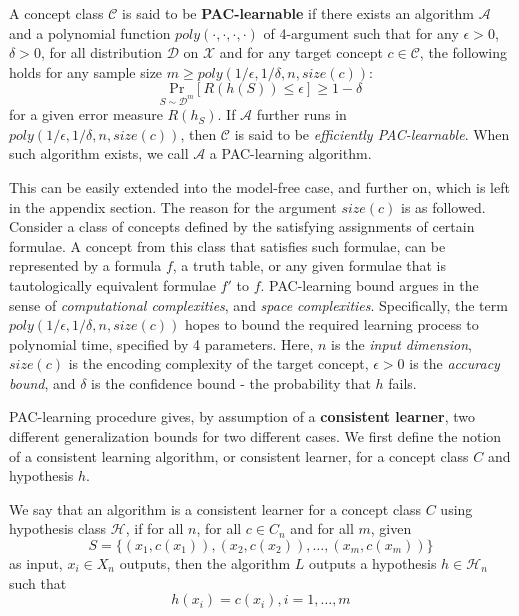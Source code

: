 \documentclass[twoside,10pt]{article}
\begin{document}
\begin{definition}
    A concept class $\mathcal{C}$ is said to be \textbf{PAC-learnable} if there exists an algorithm $\mathcal{A}$ and a polynomial function $poly(\cdot,\cdot,\cdot,\cdot)$ of 4-argument such that for any $\epsilon>0$, $\delta>0$, for all distribution $\mathcal{D}$ on $\mathcal{X}$ and for any target concept $c\in\mathcal{C}$, the following holds for any sample size $m\geq poly(1/\epsilon,1/\delta,n,size(c))$: $$\underset{S\sim \mathcal{D}^{m}}{\mathrm{Pr}}\left[ R(h(S))\leq \epsilon \right]\geq 1-\delta$$
    for a given error measure $R(h_{S})$. If $\mathcal{A}$ further runs in $poly(1/\epsilon,1/\delta,n,size(c))$, then $\mathcal{C}$ is said to be \textit{efficiently PAC-learnable}. When such algorithm exists, we call $\mathcal{A}$ a PAC-learning algorithm. 
\end{definition}
This can be easily extended into the model-free case, and further on, which is left in the appendix section. The reason for the argument $size(c)$ is as followed. Consider a class of concepts defined by the satisfying assignments of certain formulae. A concept from this class that satisfies such formulae, can be represented by a formula $f$, a truth table, or any given formulae that is tautologically equivalent formulae $f'$ to $f$. PAC-learning bound argues in the sense of \textit{computational complexities}, and \textit{space complexities}. Specifically, the term $poly(1/\epsilon,1/\delta,n,size(c))$ hopes to bound the required learning process to polynomial time, specified by 4 parameters. Here, $n$ is the \textit{input dimension}, $size(c)$ is the encoding complexity of the target concept, $\epsilon>0$ is the \textit{accuracy bound}, and $\delta$ is the confidence bound - the probability that $h$ fails.

PAC-learning procedure gives, by assumption of a \textbf{consistent learner}, two different generalization bounds for two different cases. We first define the notion of a consistent learning algorithm, or consistent learner, for a concept class $C$ and hypothesis $h$. 
\begin{definition}
    We say that an algorithm is a consistent learner for a concept class $C$ using hypothesis class $\mathcal{H}$, if for all $n$, for all $c\in C_n$ and for all $m$, given 
    \begin{equation*}
        S = \{ (x_1, c(x_1)) , (x_2, c(x_2)) ,\dots, (x_m, c(x_m))  \} 
    \end{equation*}
    as input, $x_i \in X_n$ outputs, then the algorithm $L$ outputs a hypothesis $h\in \mathcal{H}_n$ such that $$h(x_i) = c(x_i) , i = 1,\dots,m$$ 
\end{definition}
\end{document}
